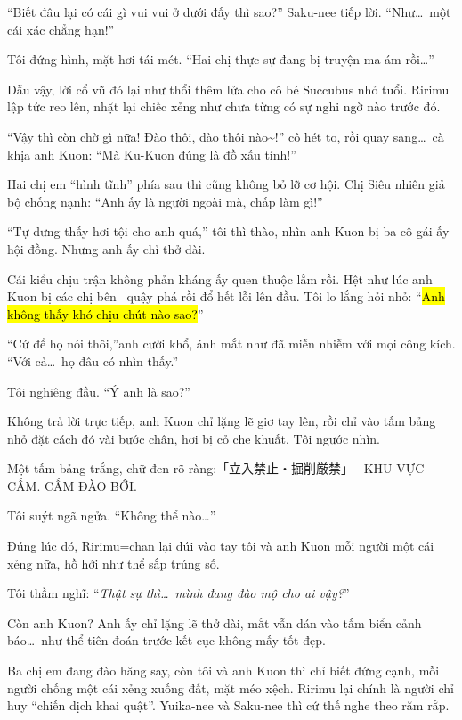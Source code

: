 \documentclass[../main.tex]{subfiles}
\begin{document}
``Biết đâu lại có cái gì vui vui ở dưới đấy thì sao?'' Saku-nee tiếp lời. ``Như\dots\ một cái xác chẳng hạn!''

Tôi đứng hình, mặt hơi tái mét. ``Hai chị thực sự đang bị truyện ma ám rồi\dots''

Dẫu vậy, lời cổ vũ đó lại như thổi thêm lửa cho cô bé Succubus nhỏ tuổi. Ririmu lập tức reo lên, nhặt lại chiếc xẻng như chưa từng có sự nghi ngờ nào trước đó.

``Vậy thì còn chờ gì nữa! Đào thôi, đào thôi nào\~{}!'' cô hét to, rồi quay sang\dots\ cà khịa anh Kuon: ``Mà Ku-Kuon đúng là đồ xấu tính!''

Hai chị em ``hình tĩnh'' phía sau thì cũng không bỏ lỡ cơ hội. Chị Siêu nhiên giả bộ chống nạnh: ``Anh ấy là người ngoài mà, chấp làm gì!''

``Tự dưng thấy hơi tội cho anh quá,'' tôi thì thào, nhìn anh Kuon bị ba cô gái ấy hội đồng. Nhưng anh ấy chỉ thở dài.

Cái kiểu chịu trận không phản kháng ấy quen thuộc lắm rồi. Hệt như lúc anh Kuon bị các chị bên \hll\ quậy phá rồi đổ hết lỗi lên đầu. Tôi lo lắng hỏi nhỏ: ``\hl{Anh không thấy khó chịu chút nào sao?}''

``Cứ để họ nói thôi,''anh cười khổ, ánh mắt như đã miễn nhiễm với mọi công kích. ``Với cả\dots\ họ đâu có nhìn thấy.''

Tôi nghiêng đầu. ``Ý anh là sao?''

Không trả lời trực tiếp, anh Kuon chỉ lặng lẽ giơ tay lên, rồi chỉ vào tấm bảng nhỏ đặt cách đó vài bước chân, hơi bị cỏ che khuất. Tôi ngước nhìn.

Một tấm bảng trắng, chữ đen rõ ràng:「立入禁止・掘削厳禁」– KHU VỰC CẤM. CẤM ĐÀO BỚI.

Tôi suýt ngã ngửa. ``Không thể nào\dots''

Đúng lúc đó, Ririmu=chan lại dúi vào tay tôi và anh Kuon mỗi người một cái xẻng nữa, hồ hởi như thể sắp trúng số.

Tôi thầm nghĩ: ``\textit{Thật sự thì\dots\ mình đang đào mộ cho ai vậy?}''

Còn anh Kuon? Anh ấy chỉ lặng lẽ thở dài, mắt vẫn dán vào tấm biển cảnh báo\dots\ như thể tiên đoán trước kết cục không mấy tốt đẹp.

\ct

Ba chị em đang đào hăng say, còn tôi và anh Kuon thì chỉ biết đứng cạnh, mỗi người chống một cái xẻng xuống đất, mặt méo xệch. Ririmu lại chính là người chỉ huy ``chiến dịch khai quật''. Yuika-nee và Saku-nee thì cứ thế nghe theo răm rắp.
\end{document}
